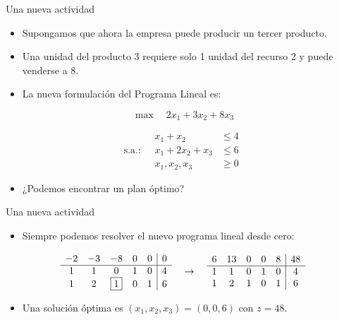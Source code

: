 \documentclass{beamer}
\begin{document}
\begin{frame}{Una nueva actividad}
    \begin{itemize}
        \item Supongamos que ahora la empresa puede producir un tercer producto.
        \item Una unidad del producto 3 requiere solo 1 unidad del recurso 2 y puede venderse a 8.
        \item La nueva formulación del Programa Lineal es:
    \end{itemize}
    
    \[
    \max \quad 2x_1 + 3x_2 + 8x_3
    \]
    
    \[
    \text{s.a.:} \quad 
    \begin{aligned}
    x_1 + x_2 &\leq 4 \\
    x_1 + 2x_2 + x_3 &\leq 6 \\
    x_1, x_2, x_3 &\geq 0
    \end{aligned}
    \]
    
    \vspace{0.5cm}
    
    \begin{itemize}
        \item ¿Podemos encontrar un plan óptimo?
    \end{itemize}
\end{frame}

\begin{frame}{Una nueva actividad}
    \begin{itemize}
        \item Siempre podemos resolver el nuevo programa lineal desde cero:
    \end{itemize}
    \[
    \begin{array}{ccccc|c}
        -2 & -3 & -8 & 0 & 0 & 0 \\
        \hline
        1 & 1 & 0 & 1 & 0 & 4 \\
        1 & 2 & \fbox{1} & 0 & 1 & 6 
    \end{array}
    \quad \rightarrow \quad
    \begin{array}{ccccc|c}
        6 & 13 & 0 & 0 & 8 & 48 \\
        \hline
        1 & 1 & 0 & 1 & 0 & 4 \\
        1 & 2 & 1 & 0 & 1 & 6 
    \end{array}
    \]
    \begin{itemize}
        \item Una solución óptima es \( (x_1, x_2, x_3) = (0, 0, 6) \) con \( z = 48 \).
    \end{itemize}
\end{frame}
\end{document}
